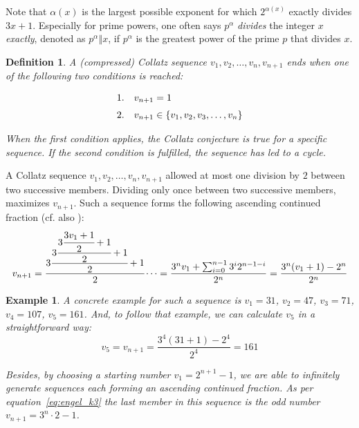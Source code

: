 \documentclass[12pt]{amsart}
\newtheorem{definition}[theorem]{Definition}
\newtheorem{example}[theorem]{Example}
\theoremstyle{definition}
\begin{document}
\par\medskip
Note that $\alpha(x)$ is the largest possible exponent for which $2^{\alpha(x)}$ exactly divides $3x+1$. Especially for prime powers, one often says $p^\alpha$ \textit{divides} the integer $x$ \textit{exactly}, denoted as $p^\alpha\mathrel\Vert x$, if $p^\alpha$ is the greatest power of the prime $p$ that divides $x$.

\newpage
\begin{definition}
\label{def:halting_conditions}
A (compressed) Collatz sequence $v_1,v_2,\ldots,v_n,v_{n+1}$ ends when one of the following two conditions is reached:

\[
\begin{array}{ll}
\text{1.}&v_{n+1}=1\\[\medskipamount]
\text{2.}&v_{n+1}\in\{v_1,v_2,v_3,\ldots,v_n\}
\end{array}
\]

When the first condition applies, the Collatz conjecture is true for a specific sequence. If the second condition is fulfilled, the sequence has led to a cycle.
\end{definition}

\par\bigskip\noindent
A Collatz sequence $v_1,v_2,\ldots,v_n,v_{n+1}$ allowed at most one division by $2$ between two successive members. Dividing only once between two successive members, maximizes $v_{n+1}$. Such a sequence forms the following ascending continued fraction (cf. also \cite[p.~11]{Ref_Laarhoven}):
\begin{equation}
\label{eq:engel_k3}
v_{n+1}=\cfrac{3\cfrac{3\cfrac{3\cfrac{3v_1+1}{2}+1}{2}+1}{2}+1}{2}\dotsb
=\frac{3^nv_1+\sum_{i=0}^{n-1}3^i2^{n-1-i}}{2^n}
=\frac{3^n(v_1+1)-2^n}{2^n}
\end{equation}

\medskip
\begin{example}
\label{ex:engel_31}
A concrete example for such a sequence is $v_1=31$, $v_2=47$, $v_3=71$, $v_4=107$, $v_5=161$. And, to follow that example, we can calculate $v_5$ in a straightforward way:
\[
v_5=v_{n+1}=\frac{3^4(31+1)-2^4}{2^4}=161
\]

\par\medskip
Besides, by choosing a starting number $v_1=2^{n+1}-1$, we are able to infinitely generate sequences each forming an ascending continued fraction. As per equation~\ref{eq:engel_k3} the last member in this sequence is the odd number $v_{n+1}=3^n\cdot2-1$.
\end{example}
\end{document}
